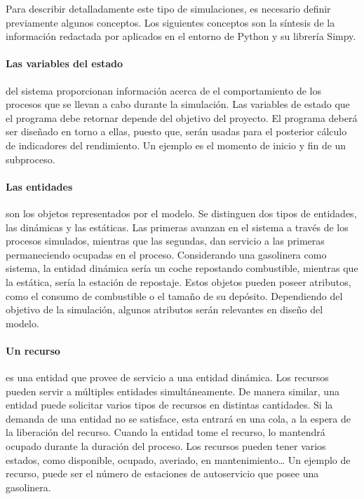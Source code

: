 Para describir detalladamente este tipo de simulaciones,
es necesario definir previamente algunos conceptos.
Los siguientes conceptos
son la síntesis de la información redactada por \citet{banks1998handbook}
aplicados en el entorno de Python y su librería Simpy.

\paragraph{Las variables del estado}
del sistema proporcionan información
acerca de el comportamiento de los procesos
que se llevan a cabo durante la simulación.
Las variables de estado que el programa debe retornar
depende del objetivo del proyecto.
El programa deberá ser diseñado en torno a ellas,
puesto que, serán usadas
para el posterior cálculo de indicadores del rendimiento.
Un ejemplo es el momento de inicio y fin de un subproceso.

\paragraph{Las entidades}
son los objetos representados por el modelo.
Se distinguen dos tipos de entidades,
las dinámicas y las estáticas.
Las primeras avanzan en el sistema
a través de los procesos simulados, 
mientras que las segundas, dan servicio a las primeras
permaneciendo ocupadas en el proceso.
Considerando una gasolinera como sistema,
la entidad dinámica sería un coche repostando combustible,
mientras que la estática, sería la estación de repostaje.
Estos objetos pueden poseer atributos,
como el consumo de combustible o el tamaño de su depósito.
Dependiendo del objetivo de la simulación,
algunos atributos serán relevantes en diseño del modelo.

\paragraph{Un recurso}
es una entidad
que provee de servicio a una entidad dinámica.
Los recursos pueden servir a múltiples entidades simultáneamente.
De manera similar, una entidad puede
solicitar varios tipos de recursos en distintas cantidades.
Si la demanda de una entidad no se satisface,
esta entrará en una cola,
a la espera de la liberación del recurso.
Cuando la entidad tome el recurso,
lo mantendrá ocupado durante la duración del proceso.
Los recursos pueden tener varios estados,
como disponible, ocupado, averiado, en mantenimiento\ldots
Un ejemplo de recurso, puede ser el número de
estaciones de autoservicio que posee una gasolinera.

